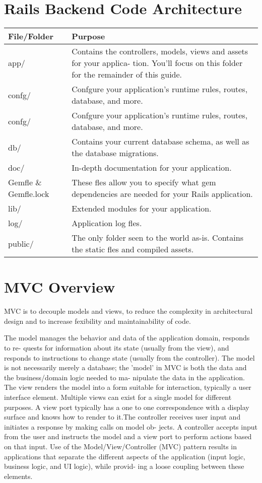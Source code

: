 \documentclass[12pt]{article}
\begin{document}
\section{Rails Backend Code Architecture}
\begin{tabular}{|l|p{10cm}|}
\hline
File/Folder & Purpose \\
\hline
app/ & Contains the controllers, models, views and assets for your applica- tion. You’ll focus on this folder for the remainder of this guide. \\
\hline
confg/ & Confgure your application’s runtime rules, routes, database, and more. \\
\hline
confg/ & Confgure your application’s runtime rules, routes, database, and more. \\
\hline
db/ & Contains your current database schema, as well as the database migrations. \\
\hline
doc/ & In-depth documentation for your application. \\
\hline
Gemfle \& Gemfle.lock & These fles allow you to specify what gem dependencies are needed for your Rails application. \\
\hline
lib/ & Extended modules for your application. \\
\hline
log/ & Application log fles. \\
\hline
public/ & The only folder seen to the world as-is. Contains the static fles and compiled assets. \\
\hline
\end{tabular}

\section{MVC Overview}
MVC is to decouple models and views, to reduce the complexity in architectural design and to increase fexibility and maintainability of code.

The model manages the behavior and data of the application domain, responds to re- quests for information about its state (usually from the view), and responds to instructions to change state (usually from the controller). The model is not necessarily merely a database; the 'model' in MVC is both the data and the business/domain logic needed to ma- nipulate the data in the application.
The view renders the model into a form suitable for interaction, typically a user interface element. Multiple views can exist for a single model for different purposes. A view port typically has a one to one correspondence with a display surface and knows how to render to it.The controller receives user input and initiates a response by making calls on model ob- jects. A controller accepts input from the user and instructs the model and a view port to perform actions based on that input.
Use of the Model/View/Controller (MVC) pattern results in applications that separate the different aspects of the application (input logic, business logic, and UI logic), while provid- ing a loose coupling between these elements.
\end{document}
